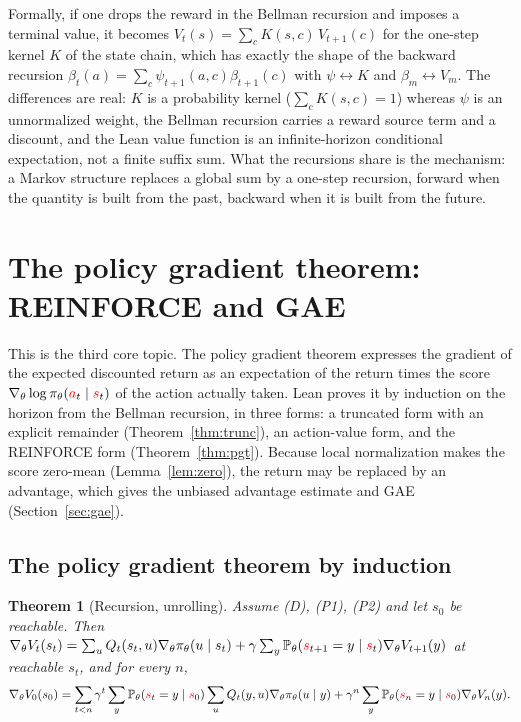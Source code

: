 \documentclass[11pt,a4paper]{article}
\newtheorem{theorem}{Theorem}[section]
\newcommand{\Prb}{\mathbb{P}}
\newcommand{\rv}[1]{{\color{red}#1}}       %
\newcommand{\sv}{\rv{s}}
\newcommand{\av}{\rv{a}}
\newcommand{\grad}{\nabla_{\theta}}
\begin{document}
Formally, if one drops the reward in the Bellman recursion and imposes a terminal value, it becomes $V_t(s)=\sum_cK(s,c)\,V_{t+1}(c)$ for the one-step kernel $K$ of the state chain, which has exactly the shape of the backward recursion $\beta_t(a)=\sum_c\psi_{t+1}(a,c)\beta_{t+1}(c)$ with $\psi\leftrightarrow K$ and $\beta_m\leftrightarrow V_m$.
The differences are real: $K$ is a probability kernel ($\sum_cK(s,c)=1$) whereas $\psi$ is an unnormalized weight, the Bellman recursion carries a reward source term and a discount, and the Lean value function is an infinite-horizon conditional expectation, not a finite suffix sum.
What the recursions share is the mechanism: a Markov structure replaces a global sum by a one-step recursion, forward when the quantity is built from the past, backward when it is built from the future.

\section{The policy gradient theorem: REINFORCE and GAE}
\label{sec:pg}

This is the third core topic.
The policy gradient theorem expresses the gradient of the expected discounted return as an expectation of the return times the score $\grad\log\pi_\theta(\av_t\mid\sv_t)$ of the action actually taken.
Lean proves it by induction on the horizon from the Bellman recursion, in three forms: a truncated form with an explicit remainder (Theorem~\ref{thm:trunc}), an action-value form, and the REINFORCE form (Theorem~\ref{thm:pgt}).
Because local normalization makes the score zero-mean (Lemma~\ref{lem:zero}), the return may be replaced by an advantage, which gives the unbiased advantage estimate and GAE (Section~\ref{sec:gae}).

\subsection{The policy gradient theorem by induction}
\label{sec:pgind}
\begin{theorem}[Recursion, unrolling]
\label{thm:rec}
Assume (D), (P1), (P2) and let $s_0$ be reachable.
Then $\grad V_t(s_t)=\sum_uQ_t(s_t,u)\grad\pi_\theta(u\mid s_t)+\gamma\sum_y\Prb_\theta(\sv_{t+1}=y\mid\sv_t)\grad V_{t+1}(y)$ at reachable $s_t$, and for every $n$,
\[
\grad V_0(s_0)=\sum_{t<n}\gamma^t\sum_y\Prb_\theta(\sv_t=y\mid\sv_0)\sum_uQ_t(y,u)\grad\pi_\theta(u\mid y)+\gamma^n\sum_y\Prb_\theta(\sv_n=y\mid\sv_0)\grad V_n(y).
\]
\end{theorem}
\end{document}
